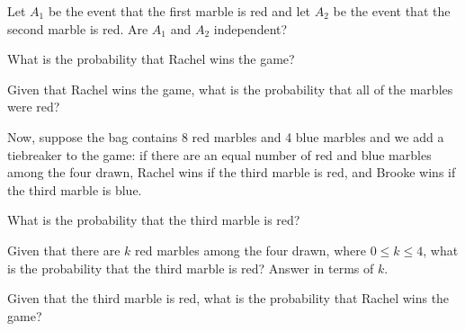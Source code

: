 \documentclass[11pt]{article}
\begin{document}
\begin{Parts}
    \Part Let $A_1$ be the event that the first marble is red and let $A_2$ be 
    the event that the second marble is red. Are $A_1$ and $A_2$ independent?
    
    \Part What is the probability that Rachel wins the game?
    
    \Part Given that Rachel wins the game, what is the probability that all of 
    the marbles were red?
\end{Parts}

Now, suppose the bag contains 8 red marbles and 4 blue marbles and we add a 
tiebreaker to the game: if there are an equal number of red and blue marbles 
among the four drawn, Rachel wins if the third marble is red, and Brooke wins 
if the third marble is blue.

\begin{Parts}[resume]
    \Part What is the probability that the third marble is red?
    
    \Part Given that there are $k$ red marbles among the four drawn, where 
    $0 \leq k \leq 4$, what is the probability that the third marble is red? 
    Answer in terms of $k$.
    
    \Part Given that the third marble is red, what is the probability that 
    Rachel wins the game?
    
\end{Parts}

\pagebreak
\end{document}

